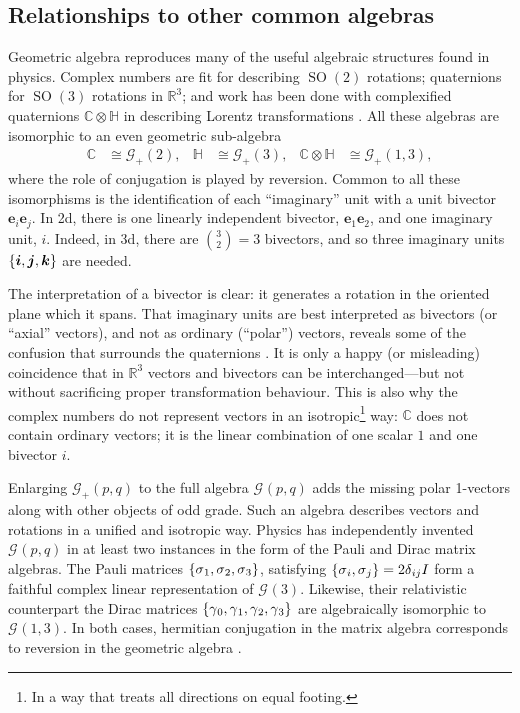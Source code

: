 \documentclass[12pt,a4paper]{article}
\renewcommand{\vb}[1]{\boldsymbol{#1}}
\newcommand{\ve}[1]{\vb{e}_{#1}}
\newcommand{\GA}[1][]{\mathcal{G}_{#1}}
\newcommand{\RR}{\mathds{R}}
\newcommand{\CC}{\mathds{C}}
\newcommand{\HH}{\mathds{H}}
\DeclareMathOperator{\SO}{SO}
\begin{document}
\subsection{Relationships to other common algebras}

Geometric algebra reproduces many of the useful algebraic structures found in physics.
Complex numbers are fit for describing $\SO(2)$ rotations; quaternions for $\SO(3)$ rotations in $\RR^3$; and work has been done with complexified quaternions $\CC\otimes\HH$ in describing Lorentz transformations \cite{berry2020quat-sr,berry2021quat-sr}.
All these algebras are isomorphic to an even geometric sub-algebra
\begin{align}
	\CC &\cong \GA[+](2)
,&	\HH &\cong \GA[+](3)
,&	\CC\otimes\HH &\cong \GA[+](1,3)
,\end{align}
where the role of conjugation is played by reversion.
Common to all these isomorphisms is the identification of each ``imaginary'' unit with a unit bivector $\ve{i}\ve{j}$.
In 2d, there is one linearly independent bivector, $\ve1\ve2$, and one imaginary unit, $i$.
Indeed, in 3d, there are $\binom{3}{2} = 3$ bivectors, and so three imaginary units $\qty{\vb i, \vb j, \vb k}$ are needed.

The interpretation of a bivector is clear: it generates a rotation in the oriented plane which it spans.
That imaginary units are best interpreted as bivectors (or ``axial'' vectors), and not as ordinary (``polar'') vectors, reveals some of the confusion that surrounds the quaternions \cite{chappell2016quat-history,altmann1989quat-history}.
It is only a happy (or misleading) coincidence that in $\RR^3$ vectors and bivectors can be interchanged---but not without sacrificing proper transformation behaviour.
This is also why the complex numbers do not represent vectors in an isotropic\footnote{In a way that treats all directions on equal footing.} way: $\CC$ does not contain ordinary vectors; it is the linear combination of one scalar $1$ and one bivector $i$.

Enlarging $\GA[+](p, q)$ to the full algebra $\GA(p, q)$ adds the missing polar 1-vectors along with other objects of odd grade.
Such an algebra describes vectors and rotations in a unified and isotropic way.
Physics has independently invented $\GA(p, q)$ in at least two instances in the form of the Pauli and Dirac matrix algebras.
The Pauli matrices $\qty{\sigma{}_1, \sigma{}_2, \sigma{}_3}$, satisfying $\qty{\sigma{}_i, \sigma{}_j} = 2\delta{}_{ij}I$ form a faithful complex linear representation of $\GA(3)$.
Likewise, their relativistic counterpart the Dirac matrices $\qty{\gamma{}_0, \gamma{}_1, \gamma{}_2, \gamma{}_3}$ are algebraically isomorphic to $\GA(1,3)$.
In both cases, hermitian conjugation in the matrix algebra corresponds to reversion in the geometric algebra \cite[\textsection{}\,5]{doran2003ga}.
\end{document}
